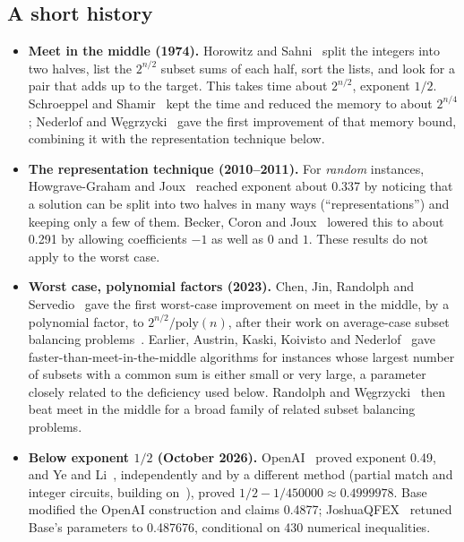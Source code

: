 \documentclass[11pt]{article}
\newcommand{\poly}{\mathrm{poly}}
\theoremstyle{plain}
\begin{document}
\subsection*{A short history}
\begin{itemize}
\item \textbf{Meet in the middle (1974).} Horowitz and Sahni~\cite{hs} split the integers into two halves, list the $2^{n/2}$ subset sums of each half, sort the lists, and look for a pair that adds up to the target. This takes time about $2^{n/2}$, exponent $1/2$. Schroeppel and Shamir~\cite{ss} kept the time and reduced the memory to about $2^{n/4}$; Nederlof and W\k{e}grzycki~\cite{nw} gave the first improvement of that memory bound, combining it with the representation technique below.
\item \textbf{The representation technique (2010--2011).} For \emph{random} instances, Howgrave-Graham and Joux~\cite{hgj} reached exponent about 0.337 by noticing that a solution can be split into two halves in many ways (``representations'') and keeping only a few of them. Becker, Coron and Joux~\cite{bcj} lowered this to about 0.291 by allowing coefficients $-1$ as well as $0$ and $1$. These results do not apply to the worst case.
\item \textbf{Worst case, polynomial factors (2023).} Chen, Jin, Randolph and Servedio~\cite{cjrs23} gave the first worst-case improvement on meet in the middle, by a polynomial factor, to $2^{n/2}/\poly(n)$, after their work on average-case subset balancing problems~\cite{cjrs22}. Earlier, Austrin, Kaski, Koivisto and Nederlof~\cite{akkn} gave faster-than-meet-in-the-middle algorithms for instances whose largest number of subsets with a common sum is either small or very large, a parameter closely related to the deficiency used below. Randolph and W\k{e}grzycki~\cite{rw} then beat meet in the middle for a broad family of related subset balancing problems.
\item \textbf{Below exponent $1/2$ (October 2026).} OpenAI~\cite{openai} proved exponent 0.49, and Ye and Li~\cite{yeli}, independently and by a different method (partial match and integer circuits, building on~\cite{rw}), proved $1/2 - 1/450000 \approx 0.4999978$. Base~\cite{base} modified the OpenAI construction and claims 0.4877; JoshuaQFEX~\cite{joshua} retuned Base's parameters to 0.487676, conditional on 430 numerical inequalities.
\end{itemize}
\end{document}
